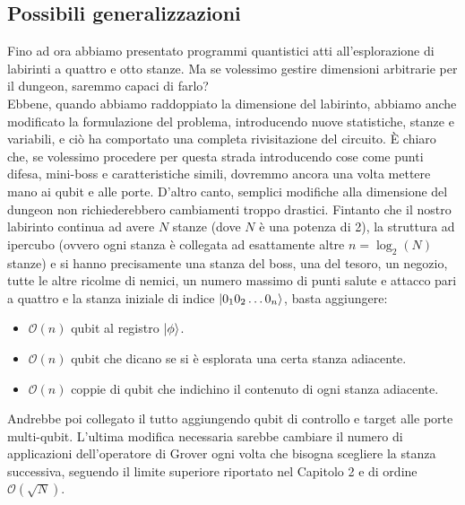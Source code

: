 \documentclass{book}
\theoremstyle{definition}
\theoremstyle{definition}
\theoremstyle{definition}
\theoremstyle{plain}
\theoremstyle{plain}
\theoremstyle{plain}
\theoremstyle{plain}
\begin{document}
\subsection{Possibili generalizzazioni}
Fino ad ora abbiamo presentato programmi quantistici atti all'esplorazione di labirinti a quattro e otto stanze. Ma se volessimo gestire dimensioni arbitrarie per il dungeon, saremmo capaci di farlo?\\
Ebbene, quando abbiamo raddoppiato la dimensione del labirinto, abbiamo anche modificato la formulazione del problema, introducendo nuove statistiche, stanze e variabili, e ciò ha comportato una completa rivisitazione del circuito. È chiaro che, se volessimo procedere per questa strada introducendo cose come punti difesa, mini-boss e caratteristiche simili, dovremmo ancora una volta mettere mano ai qubit e alle porte. D'altro canto, semplici modifiche alla dimensione del dungeon non richiederebbero cambiamenti troppo drastici. Fintanto che il nostro labirinto continua ad avere $N$ stanze (dove $N$ è una potenza di 2), la struttura ad ipercubo (ovvero ogni stanza è collegata ad esattamente altre $n = \log_2 (N)$ stanze) e si hanno precisamente una stanza del boss, una del tesoro, un negozio, tutte le altre ricolme di nemici, un numero massimo di punti salute e attacco pari a quattro e la stanza iniziale di indice $\ket{0_1 0_2 \dots 0_n}$, basta aggiungere:
\begin{itemize}
    \item $\mathcal{O}(n)$ qubit al registro $\ket{\phi}$.
    \item $\mathcal{O}(n)$ qubit che dicano se si è esplorata una certa stanza adiacente.
    \item $\mathcal{O}(n)$ coppie di qubit che indichino il contenuto di ogni stanza adiacente.
\end{itemize}
Andrebbe poi collegato il tutto aggiungendo qubit di controllo e target alle porte multi-qubit. L'ultima modifica necessaria sarebbe cambiare il numero di applicazioni dell'operatore di Grover ogni volta che bisogna scegliere la stanza successiva, seguendo il limite superiore riportato nel Capitolo 2 e di ordine $\mathcal{O}(\sqrt{N})$.





\newpage
\end{document}
